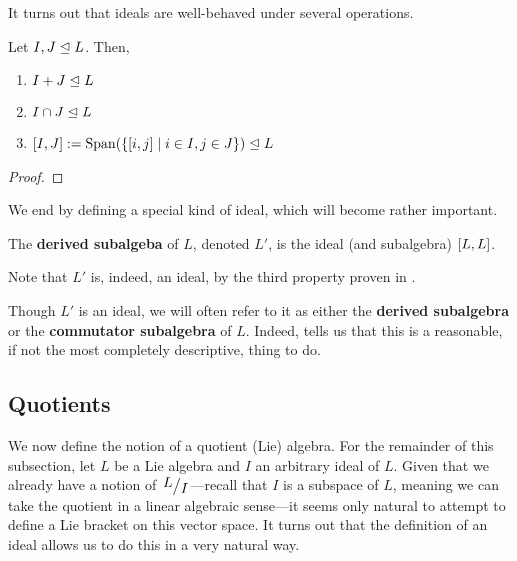 It turns out that ideals are well-behaved under several operations.

\begin{boxproposition}\label{Ch1:Prop:IdealBhv}
    Let $I, J \trianglelefteq L$. Then,
    \begin{enumerate}[label = \normalfont\arabic*., noitemsep]
        \item $I + J \trianglelefteq L$
        \item $I \cap J \trianglelefteq L$
        \item $\left[ I, J \right] := \operatorname{Span}\!\left( \left\{ \left[ i, j \right] \; \middle\vert \; i \in I, j \in J \right\} \right) \trianglelefteq L$
    \end{enumerate}
\end{boxproposition}
\begin{proof}
    \sorry
\end{proof}

We end by defining a special kind of ideal, which will become rather important.

\begin{boxdefinition}\label{Ch1:Def:DerivedSubalg}
    The \textbf{derived subalgeba} of $L$, denoted $L'$, is the ideal (and subalgebra) $\left[ L, L \right]$.
\end{boxdefinition}

Note that $L'$ is, indeed, an ideal, by the third property proven in .

\begin{boxconvention}
    Though $L'$ is an ideal, we will often refer to it as either the \textbf{derived subalgebra} or the \textbf{commutator subalgebra} of $L$. Indeed,  tells us that this is a reasonable, if not the most completely descriptive, thing to do.
\end{boxconvention}

\subsection{Quotients}

We now define the notion of a quotient (Lie) algebra. For the remainder of this subsection, let $L$ be a Lie algebra and $I$ an arbitrary ideal of $L$. Given that we already have a notion of $\quotient{L}{I}$---recall that $I$ is a subspace of $L$, meaning we can take the quotient in a linear algebraic sense---it seems only natural to attempt to define a Lie bracket on this vector space. It turns out that the definition of an ideal allows us to do this in a very natural way.

